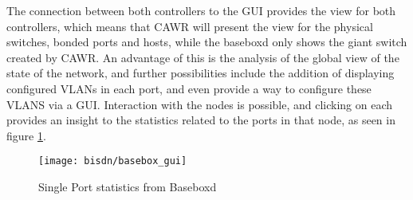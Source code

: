 \par The connection between both controllers to the GUI provides the view for both controllers, which means that CAWR will present the view for the physical
switches, bonded ports and hosts, while the baseboxd only shows the giant switch created by CAWR. An advantage of this is the analysis of the global view of the
state of the network, and further possibilities include the addition of displaying configured VLANs in each port, and even provide a way to configure these VLANS
via a GUI. Interaction with the nodes is possible, and clicking on each provides an insight to the statistics related to the ports in that node, as seen in figure
\ref{fig:basebox_stats}.

\begin{figure}[H]
    \centering
    \texttt{[image: bisdn/basebox\_gui]}
    \caption{Single Port statistics from Baseboxd}
    \label{fig:basebox_stats}
\end{figure}
